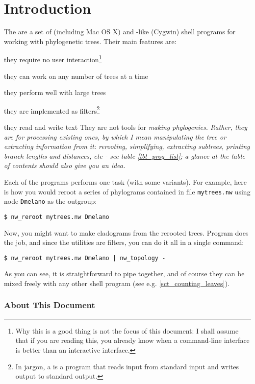 \chapter{Introduction}

The \nutils{} are a set of \unix{} (including Mac OS X) and \unix-like (Cygwin) shell programs for working with phylogenetic trees. Their main features are:
\startitemize
 \item they require no user interaction\footnote{Why this is a good thing is not the focus of this document: I shall assume that if you are reading this, you already know when a command-line interface is better than an interactive interface.}
 \item they can work on any number of trees at a time
 \item they perform well with large trees
 \item they are implemented as filters\footnote{In \unix{} jargon, a
  is a program that reads input from standard input and writes
 output to standard output.}
 \item they read and write text
\stopitemize
They are not tools for \em{making} phylogenies. Rather, they are for
processing existing ones, by which I mean manipulating the tree or extracting
information from it: rerooting, simplifying, extracting subtrees, printing
branch lengths and distances, etc - see table \ref{tbl_prog_list}; a glance
at the table of contents should also give you an idea.

Each of the programs performs one task (with some variants). For example, here
is how you would reroot a series of phylograms contained in file
\texttt{mytrees.nw} using node \texttt{Dmelano} as the outgroup:

\begin{verbatim}
$ nw_reroot mytrees.nw Dmelano
\end{verbatim} 
Now, you might want to make cladograms from the rerooted trees. Program
\topology{} does the job, and since the utilities are filters, you can do it
all in a single command:
\begin{verbatim}
$ nw_reroot mytrees.nw Dmelano | nw_topology -
\end{verbatim}
As you can see, it is straightforward to pipe \nutils{} together, and of course they can be mixed freely with any other shell program (see e.g. \ref{sct_counting_leaves}).

\subsection*{About This Document}

